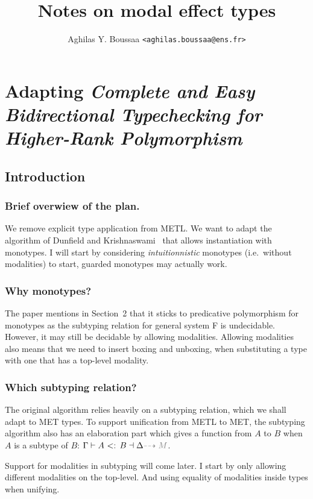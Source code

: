 \documentclass[a4paper,11pt]{article}
\author{Aghilas Y. Boussaa \texttt{<aghilas.boussaa@ens.fr>}}
\title{Notes on modal effect types}
\begin{document}
\sloppy
\maketitle

\section{Adapting \emph{Complete and Easy Bidirectional Typechecking for Higher-Rank Polymorphism}}
\subsection{Introduction}
\subsubsection{Brief overwiew of the plan.}
We remove explicit type application from \textsf{METL}. We want to adapt the
algorithm of Dunfield and Krishnaswami~\cite{dunfield2013complete} that allows
instantiation with monotypes. I will start by considering \emph{intuitionnistic}
monotypes (i.e.\ without modalities) to start, guarded monotypes may actually
work.

\subsubsection{Why monotypes?}
The paper mentions in Section~2 that it sticks to predicative polymorphism for
monotypes as the subtyping relation for general system F is undecidable.
However, it may still be decidable by allowing modalities. Allowing modalities
also means that we need to insert boxing and unboxing, when substituting a type
with one that has a top-level modality.

\subsubsection{Which subtyping relation?}
The original algorithm relies heavily on a subtyping relation, which we shall
adapt to \textsf{MET} types. To support unification from \textsf{METL} to
\textsf{MET}, the subtyping algorithm also has an elaboration part which gives a
function from $A$ to $B$ when $A$ is a subtype of $B$: $\Gamma\vdash A\textsf{
  <: }B\dashv\Delta{\color{gray} \dashrightarrow M}$.

Support for modalities in subtyping will come later. I start by only allowing
different modalities on the top-level. And using equality of modalities inside
types when unifying.
\end{document}
